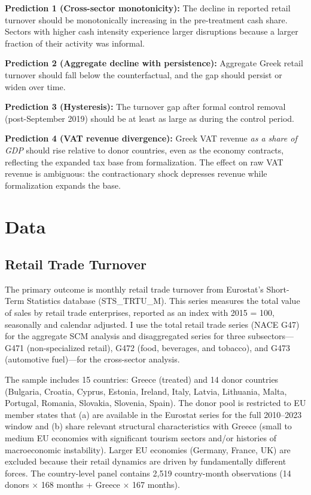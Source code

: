 \documentclass[12pt]{article}
\begin{document}
\textbf{Prediction 1 (Cross-sector monotonicity):} The decline in reported retail turnover should be monotonically increasing in the pre-treatment cash share. Sectors with higher cash intensity experience larger disruptions because a larger fraction of their activity was informal.

\textbf{Prediction 2 (Aggregate decline with persistence):} Aggregate Greek retail turnover should fall below the counterfactual, and the gap should persist or widen over time.

\textbf{Prediction 3 (Hysteresis):} The turnover gap after formal control removal (post-September 2019) should be at least as large as during the control period.

\textbf{Prediction 4 (VAT revenue divergence):} Greek VAT revenue \emph{as a share of GDP} should rise relative to donor countries, even as the economy contracts, reflecting the expanded tax base from formalization. The effect on raw VAT revenue is ambiguous: the contractionary shock depresses revenue while formalization expands the base.


\section{Data}
\label{sec:data}

\subsection{Retail Trade Turnover}

The primary outcome is monthly retail trade turnover from Eurostat's Short-Term Statistics database (STS\_TRTU\_M). This series measures the total value of sales by retail trade enterprises, reported as an index with 2015 = 100, seasonally and calendar adjusted. I use the total retail trade series (NACE G47) for the aggregate SCM analysis and disaggregated series for three subsectors---G471 (non-specialized retail), G472 (food, beverages, and tobacco), and G473 (automotive fuel)---for the cross-sector analysis.

The sample includes 15 countries: Greece (treated) and 14 donor countries (Bulgaria, Croatia, Cyprus, Estonia, Ireland, Italy, Latvia, Lithuania, Malta, Portugal, Romania, Slovakia, Slovenia, Spain). The donor pool is restricted to EU member states that (a) are available in the Eurostat series for the full 2010--2023 window and (b) share relevant structural characteristics with Greece (small to medium EU economies with significant tourism sectors and/or histories of macroeconomic instability). Larger EU economies (Germany, France, UK) are excluded because their retail dynamics are driven by fundamentally different forces. The country-level panel contains 2,519 country-month observations (14 donors $\times$ 168 months + Greece $\times$ 167 months).
\end{document}
